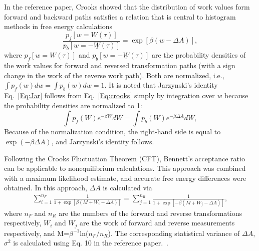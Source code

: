 In the reference paper\cite{CrooksJSP1998}, Crooks showed that the distribution of work values form forward and backward paths satisfies a relation that is central to histogram methods in free energy calculations
\begin{equation}
\frac{p_{f}[w=W(\tau)]}{p_{b}[w=-\underline{W}(\tau)]}=\exp[\beta(w-\Delta A)],
\label{Eq:crooks}
\end{equation}
where $p_{f}[w=W(\tau)]$ and $p_{b}[w=-\underline{W}(\tau)]$ are the probability densities of the work values for forward and reversed transformation paths (with a sign change in the work of the reverse work path). Both are normalized, i.e., $\int p_{f}(w) dw=\int p_{b}(w) dw=1$. It is noted that Jarzynski's identity Eq.~\ref{Eq:Jar} follows from Eq.~\ref{Eq:crooks} simply by integration over $w$ because the probability densities are normalized to 1:
\begin{equation}
\int p_{f}(W)e^{-\beta W}dW=\int p_{b}(W)e^{-\beta \Delta A}dW,
\label{Eq:crookstojar}
\end{equation}
Because of the normalization condition, the right-hand side is equal to $\exp(-\beta \Delta A)$, and Jarzynski's identity follows.

Following the Crooks Fluctuation Theorem (CFT),\cite{CrooksJSP1998} Bennett’s acceptance ratio can be applicable to nonequilibrium calculations. This approach was combined with a maximum likelihood estimate, and accurate free energy differences were obtained.\cite{ShirtsPRL2003}
In this approach, $\Delta A$ is calculated via
\begin{align}
\sum_{i=1}^{n_{F}}\frac{1}{1+\exp \left[\beta(M+W_{i}-\Delta A)\right]} = \sum_{j=1}^{n_{R}}\frac{1}{1+\exp \left[-\beta(M+W_{j}-\Delta A)\right]},
\label{Eq:NEBAR}
\end{align}
where $n_{F}$ and $n_{R}$ are the numbers of the forward and reverse transformations respectively, $W_{i}$ and $W_{j}$ are the work of forward and reverse measurements respectively, and M=$\beta^{-1}$ln($n_{F}$/$n_{R}$).
The corresponding statistical variance of $ \Delta A $, $ \sigma^2 $ is calculated using Eq. 10 in the reference paper.~\cite{ShirtsPRL2003}.